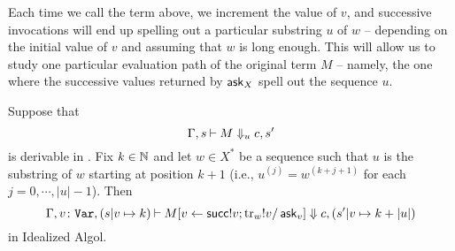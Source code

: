Each time we call the term above, we increment the value of $v$, and successive invocations will end up spelling out a particular substring $u$ of $w$ -- depending on the initial value of $v$ and assuming that $w$ is long enough.  
This will allow us to study one particular evaluation path of the original term $M$ -- namely, the one where the successive values returned by $\operatorname{{\mathsf{ask}}}_X$ spell out the sequence $u$.

\begin{lemma}
  Suppose that
  \[
    \Gamma,s\mathbin{\vdash} M\Downarrow_u c,s'
    \]
  is derivable in \IAX.
  Fix $k\in\mathbb{N}$ and let $w\in X^*$ be a sequence such that $u$ is the substring of $w$ starting at position $k+1$ (i.e., $u^{(j)}=w^{(k+j+1)}$ for each $j=0,\cdots,|u|-1$).
  Then
  \[
    \Gamma,v\colon{\mathtt{Var}},(s\vert v\mapsto k) \mathbin{\vdash} M[v\gets \operatorname{{\mathsf{succ}}}!v;\operatorname{tr}_w !v/\operatorname{{\mathsf{ask}}}_v] \Downarrow c,(s'\vert v\mapsto k + |u|)
    \]
  in Idealized Algol.
  \label{LemSoundnessMonads}
\end{lemma}

